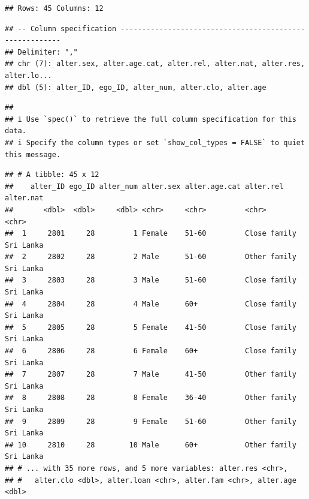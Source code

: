 \documentclass[
]{book}
\begin{document}
\begin{verbatim}
## Rows: 45 Columns: 12
\end{verbatim}

\begin{verbatim}
## -- Column specification --------------------------------------------------------
## Delimiter: ","
## chr (7): alter.sex, alter.age.cat, alter.rel, alter.nat, alter.res, alter.lo...
## dbl (5): alter_ID, ego_ID, alter_num, alter.clo, alter.age
\end{verbatim}

\begin{verbatim}
## 
## i Use `spec()` to retrieve the full column specification for this data.
## i Specify the column types or set `show_col_types = FALSE` to quiet this message.
\end{verbatim}

\begin{verbatim}
## # A tibble: 45 x 12
##    alter_ID ego_ID alter_num alter.sex alter.age.cat alter.rel    alter.nat
##       <dbl>  <dbl>     <dbl> <chr>     <chr>         <chr>        <chr>    
##  1     2801     28         1 Female    51-60         Close family Sri Lanka
##  2     2802     28         2 Male      51-60         Other family Sri Lanka
##  3     2803     28         3 Male      51-60         Close family Sri Lanka
##  4     2804     28         4 Male      60+           Close family Sri Lanka
##  5     2805     28         5 Female    41-50         Close family Sri Lanka
##  6     2806     28         6 Female    60+           Close family Sri Lanka
##  7     2807     28         7 Male      41-50         Other family Sri Lanka
##  8     2808     28         8 Female    36-40         Other family Sri Lanka
##  9     2809     28         9 Female    51-60         Other family Sri Lanka
## 10     2810     28        10 Male      60+           Other family Sri Lanka
## # ... with 35 more rows, and 5 more variables: alter.res <chr>,
## #   alter.clo <dbl>, alter.loan <chr>, alter.fam <chr>, alter.age <dbl>
\end{verbatim}
\end{document}
